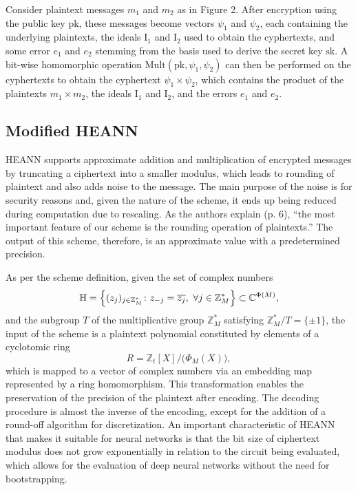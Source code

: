 \documentclass{article}
\begin{document}
\noindent
Consider plaintext messages $m_1$ and $m_2$ as in Figure 2. After encryption using the public key $\text{pk}$, these messages become vectors $\psi_1$ and $\psi_2$, each containing the underlying plaintexts, the ideals $\text{I}_1$ and $\text{I}_2$ used to obtain the cyphertexts, and some error $e_1$ and $e_2$ stemming from the basis used to derive the secret key $\text{sk}$. A bit-wise homomorphic operation $\text{Mult}(\text{pk}, \psi_1, \psi_2)$ can then be performed on the cyphertexts to obtain the cyphertext $\psi_1 \times \psi_2$, which contains the product of the plaintexts $m_1 \times m_2$, the ideals $\text{I}_1$ and $\text{I}_2$, and the errors $e_1$ and $e_2$.

\subsection{Modified HEANN}

HEANN supports approximate addition and multiplication of encrypted messages by truncating a ciphertext into a smaller modulus, which leads to rounding of plaintext and also adds noise to the message. The main purpose of the noise is for security reasons and, given the nature of the scheme, it ends up being reduced during computation due to rescaling. As the authors explain (p. 6), ``the most important feature of our scheme is the rounding operation of plaintexts.'' The output of this scheme, therefore, is an approximate value with a predetermined precision.

As per the scheme definition, given the set of complex numbers
\[
\mathbb{H} 
= \Bigl\{ (z_j)_{j \in \mathbb{Z}_M^*} \colon z_{-j} = \overline{z_j}, 
\ \forall j \in \mathbb{Z}_M^* \Bigr\}
\subset \mathbb{C}^{\Phi(M)},
\]
and the subgroup $T$ of the multiplicative group $\mathbb{Z}_M^*$ satisfying $\mathbb{Z}_M^*/T = \{\pm 1\}$, the input of the scheme is a plaintext polynomial constituted by elements of a cyclotomic ring 
\[
R 
= \mathbb{Z}_t[X]/\bigl(\Phi_M(X)\bigr),
\]
which is mapped to a vector of complex numbers via an embedding map represented by a ring homomorphism. This transformation enables the preservation of the precision of the plaintext after encoding. The decoding procedure is almost the inverse of the encoding, except for the addition of a round-off algorithm for discretization. An important characteristic of HEANN that makes it suitable for neural networks is that the bit size of ciphertext modulus does not grow exponentially in relation to the circuit being evaluated, which allows for the evaluation of deep neural networks without the need for bootstrapping.
\end{document}

